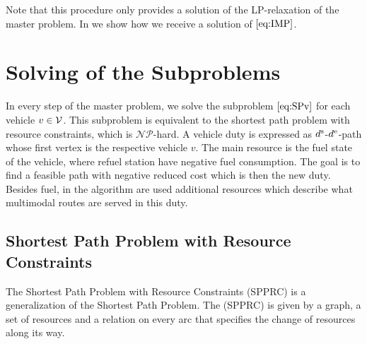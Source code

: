 Note that this procedure only provides a solution of the LP-relaxation of the master problem. In  we show how we receive a solution of $\eqref{eq:IMP}$.


\section{Solving of the Subproblems}
\label{sec:solving_subproblem}

In every step of the master problem, we solve the subproblem $\eqref{eq:SPv}$ for each vehicle $v\in\mathcal{V}$. This subproblem is equivalent to the shortest path problem with resource constraints, which is $\mathcal{NP}$-hard. A vehicle duty is expressed as $d^{\operatorname{s}}$-$d^{\operatorname{e}}$-path whose first vertex is the respective vehicle $v$. The main resource is the fuel state of the vehicle, where refuel station have negative fuel consumption. The goal is to find a feasible path with negative reduced cost which is then the new duty. Besides fuel, in the algorithm are used additional resources which describe what multimodal routes are served in this duty.

\subsection{Shortest Path Problem with Resource Constraints}

The Shortest Path Problem with Resource Constraints (SPPRC) is a generalization of the Shortest Path Problem. The (SPPRC) is given by a graph, a set of resources and a relation on every arc that specifies the change of resources along its way.

